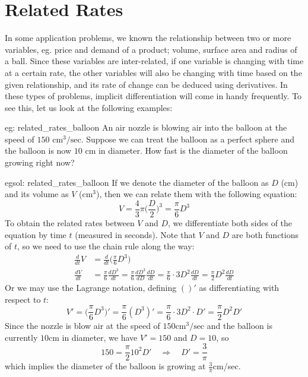 \newpage
\section{Related Rates}
In some application problems, we known the relationship between two or more variables, eg. price and demand of a product; volume, surface area and radius of a ball.  Since these variables are inter-related, if one variable is changing with time at a certain rate, the other variables will also be changing with time based on the given relationship, and its rate of change can be deduced using derivatives.  In these types of problems, implicit differentiation will come in handy frequently.  To see this, let us look at the following examples:

\begin{eg}[]{eg: related_rates_balloon}
    An air nozzle is blowing air into the balloon at the speed of $150\text{ cm}^3/\text{sec}$. Suppose we can treat the balloon as a perfect sphere and the balloon is now $10$ cm in diameter.  How fast is the diameter of the balloon growing right now? 
\end{eg}

\begin{egsol}[]{egsol: related_rates_balloon}
    If we denote the diameter of the balloon as $D$ (cm) and its volume as $V$ (cm$^3$), then we can relate them with the following equation:
    \[V =\frac{4}{3}\pi \Big(\frac{D}{2}\Big)^3 = \frac{\pi}{6}D^3\]
    To obtain the related rates between $V$ and $D$, we differentiate both sides of the equation by time $t$ (measured in seconds).  Note that $V$ and $D$ are both functions of $t$, so we need to use the chain rule along the way:
    \begin{align*}
        \frac{d}{dt}V &= \frac{d}{dt}\Big(\frac{\pi}{6} D^3\Big)\\
        \frac{dV}{dt} &= \frac{\pi}{6}\frac{dD^3}{dt} = \frac{\pi}{6}\frac{dD^3}{dD}\frac{dD}{dt} = \frac{\pi}{6}\cdot 3D^2 \frac{dD}{dt} = \frac{\pi}{2} D^2 \frac{dD}{dt}
    \end{align*}
    Or we may use the Lagrange notation, defining $()'$ as differentiating with respect to $t$:
    \[V' = \Big(\frac{\pi}{6} D^3\Big)' = \frac{\pi}{6}(D^3)' = \frac{\pi}{6}\cdot 3D^2 \cdot D' = \frac{\pi}{2} D^2D'\]
    Since the nozzle is blow air at the speed of $150\text{cm}^3/\text{sec}$ and the balloon is currently $10$cm in diameter, we have $V' = 150$ and $D = 10$, so 
    \[150 = \frac{\pi}{2}10^2 D' \quad \Rightarrow \quad D' = \frac{3}{\pi}\] 
    which implies the diameter of the balloon is growing at $\frac{3}{\pi}$cm/sec.
\end{egsol}

